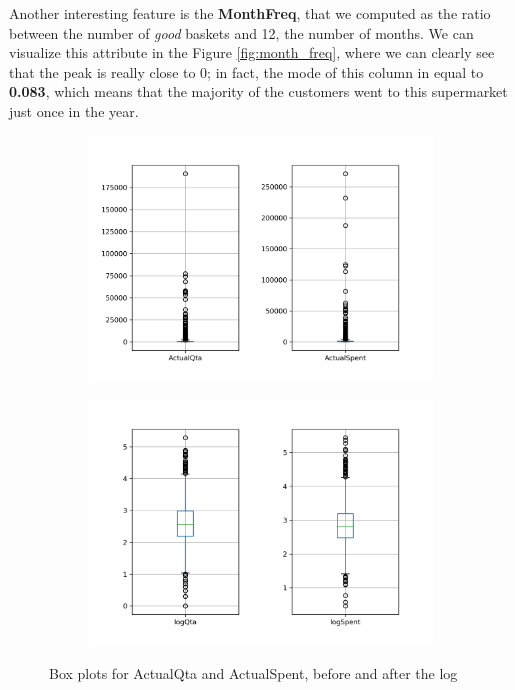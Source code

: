 Another interesting feature is the \textbf{MonthFreq}, that we computed as the ratio between the number of \emph{good} baskets and 12, the number of months. We can visualize this attribute in the Figure \ref{fig:month_freq}, where we can clearly see that the peak is really close to 0; in fact, the mode of this column in equal to \textbf{0.083}, which means that the majority of the customers went to this supermarket just once in the year.

\begin{figure}
\captionsetup{justification=centering}
\begin{subfigure}{0.5\textwidth}
\centering
\includegraphics[width=\textwidth]{img/boxplot_for_actuals.png}
\caption{}
\label{fig:boxplot_actuals}
\end{subfigure}
\begin{subfigure}{0.5\textwidth}
\centering
\includegraphics[width=\textwidth]{img/boxplot_for_log_actuals.png}
\caption{}
\label{fig:boxplot_logs}
\end{subfigure}
\caption{Box plots for ActualQta and ActualSpent, before and after the log}
\end{figure}

